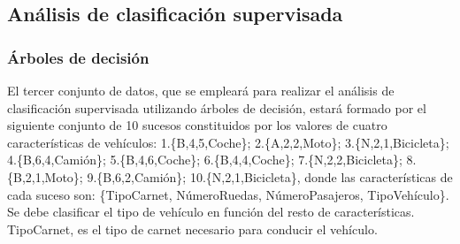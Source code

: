 \documentclass[a4paper, 12pt]{article}
\begin{document}
	\subsection{Análisis de clasificación supervisada}
	
	\subsubsection{Árboles de decisión}
	
	El tercer conjunto de datos, que se empleará para realizar el análisis de clasificación supervisada utilizando árboles de decisión, estará formado por el siguiente conjunto de 10 sucesos constituidos por los valores de cuatro características de vehículos: 1.\{B,4,5,Coche\}; 2.\{A,2,2,Moto\}; 3.\{N,2,1,Bicicleta\}; 4.\{B,6,4,Camión\}; 5.\{B,4,6,Coche\}; 6.\{B,4,4,Coche\}; 7.\{N,2,2,Bicicleta\}; 8.\{B,2,1,Moto\}; 9.\{B,6,2,Camión\}; 10.\{N,2,1,Bicicleta\}, donde las características de cada suceso son: \{TipoCarnet, NúmeroRuedas, NúmeroPasajeros, TipoVehículo\}. Se debe clasificar el tipo de vehículo en función del resto de características. TipoCarnet, es el tipo de carnet necesario para conducir el vehículo.
	
\end{document}
